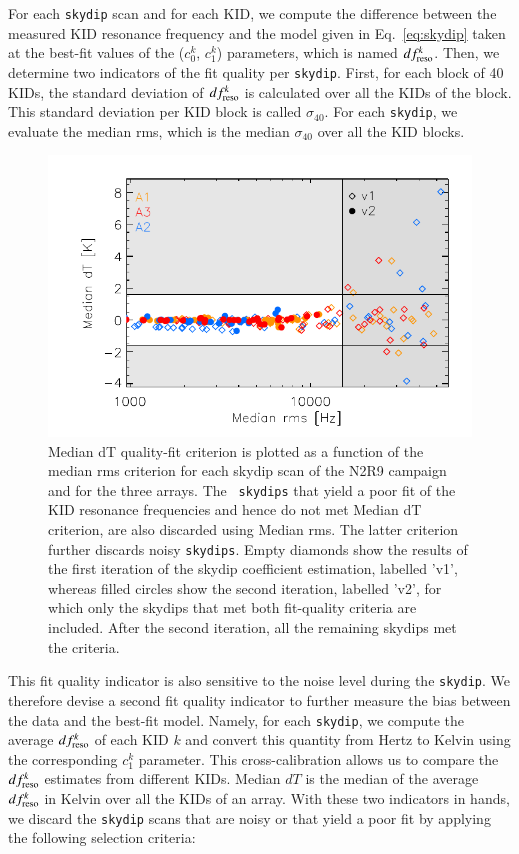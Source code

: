 \documentclass[traditionalabstract]{aa}
\newcommand{\lp}[1]{#1}
\begin{document}
For each {\tt skydip} scan and %
for each KID, 
we compute the difference between the measured KID resonance frequency and the model
given in Eq.~\ref{eq:skydip} taken at the best-fit values of the
($c_0^k$, $c_1^k$) parameters{\lp, which is named $df_{\rm{reso}}^k$.} Then, we
determine two indicators of the fit quality per {\tt skydip}. {\lp First,
for each block of 40 KIDs, the standard deviation of $df_{\rm{reso}}^k$ is calculated
over all the KIDs of the block. This standard deviation per KID block
is called $\sigma_{40}$. For each {\tt skydip}, we evaluate the
median rms, which is the median $\sigma_{40}$ over all the KID blocks.} 
%
\begin{figure}[!htbp]
\begin{center}
\includegraphics[clip=true,width=\linewidth]{Figures/plot_skydip_selection_two_crit.pdf}
\caption[N2R9 skydip scan selection.]{ Median dT quality-fit criterion
is plotted as a function of the median rms criterion for each skydip
scan of the N2R9 campaign and for the three arrays. {\lp The {\tt
skydips} that yield a poor fit of the KID resonance frequencies and hence
do not met Median dT criterion, are also discarded using
Median rms. The latter criterion further discards noisy {\tt skydips}.}
Empty diamonds show the results of the first
iteration of the skydip coefficient estimation, labelled 'v1', whereas
filled circles show the second iteration, labelled 'v2', for which only the skydips
that met both fit-quality criteria are included.
After the second iteration, all the remaining skydips met the criteria.}
\label{fig:skydipselection}
\end{center}
\end{figure}
%
This fit quality indicator is also sensitive to the noise
level during the {\tt skydip}. We therefore devise a second fit quality
indicator to further measure the bias between the data and the
best-fit model.
Namely, for each {\tt skydip}, we compute the average
$df_{\rm{reso}}^k$ of each KID $k$ and convert this quantity from Hertz to Kelvin
using the corresponding $c_1^k$ parameter. This cross-calibration
allows us to compare the $df_{\rm{reso}}^k$ estimates from different KIDs.
Median $dT$ is the median of the average $df_{\rm{reso}}^k$ in Kelvin over all the KIDs of an
array. With these two indicators in hands, we discard the {\tt skydip} scans
that are noisy or that yield a poor fit by applying the following selection
criteria:
\end{document}

